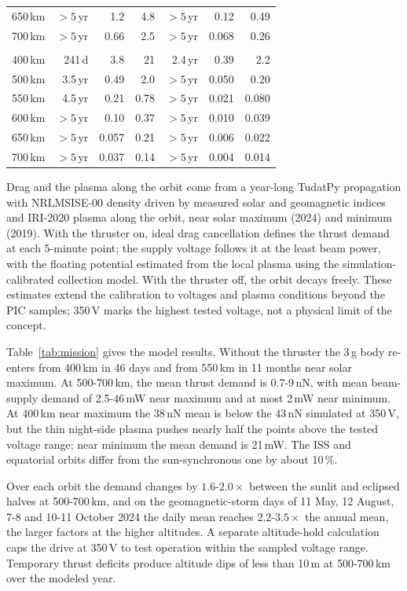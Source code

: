 \documentclass[11pt,twocolumn]{article}
\begin{document}
\begin{table}[t]
\begin{tabular}{@{}lrrrrrr@{}}
650\,km & $>5$\,yr & 1.2 & 4.8 & $>5$\,yr & 0.12 & 0.49 \\
700\,km & $>5$\,yr & 0.66 & 2.5 & $>5$\,yr & 0.068 & 0.26 \\
\addlinespace
\multicolumn{7}{@{}l}{\emph{2019, near solar minimum}} \\
400\,km & 241\,d & 3.8 & 21 & 2.4\,yr & 0.39 & 2.2 \\
500\,km & 3.5\,yr & 0.49 & 2.0 & $>5$\,yr & 0.050 & 0.20 \\
550\,km & 4.5\,yr & 0.21 & 0.78 & $>5$\,yr & 0.021 & 0.080 \\
600\,km & $>5$\,yr & 0.10 & 0.37 & $>5$\,yr & 0.010 & 0.039 \\
650\,km & $>5$\,yr & 0.057 & 0.21 & $>5$\,yr & 0.006 & 0.022 \\
700\,km & $>5$\,yr & 0.037 & 0.14 & $>5$\,yr & 0.004 & 0.014 \\
\bottomrule
\end{tabular}
\end{table}

Drag and the plasma along the orbit come from a year-long TudatPy propagation \cite{tudat} with NRLMSISE-00 density \cite{msis} driven by measured solar and geomagnetic indices and IRI-2020 plasma \cite{iri} along the orbit, near solar maximum (2024) and minimum (2019). With the thruster on, ideal drag cancellation defines the thrust demand at each 5-minute point; the supply voltage follows it at the least beam power, with the floating potential estimated from the local plasma using the simulation-calibrated collection model. With the thruster off, the orbit decays freely. These estimates extend the calibration to voltages and plasma conditions beyond the PIC samples; 350\,V marks the highest tested voltage, not a physical limit of the concept.

Table~\ref{tab:mission} gives the model results. Without the thruster the 3\,g body re-enters from 400\,km in 46 days and from 550\,km in 11 months near solar maximum. At 500-700\,km, the mean thrust demand is 0.7-9\,nN, with mean beam-supply demand of 2.5-46\,mW near maximum and at most 2\,mW near minimum. At 400\,km near maximum the 38\,nN mean is below the 43\,nN simulated at 350\,V, but the thin night-side plasma pushes nearly half the points above the tested voltage range; near minimum the mean demand is 21\,mW. The ISS and equatorial orbits differ from the sun-synchronous one by about 10\,\%.

Over each orbit the demand changes by $1.6$-$2.0\times$ between the sunlit and eclipsed halves at 500-700\,km, and on the geomagnetic-storm days of 11 May, 12 August, 7-8 and 10-11 October 2024 the daily mean reaches $2.2$-$3.5\times$ the annual mean, the larger factors at the higher altitudes. A separate altitude-hold calculation caps the drive at 350\,V to test operation within the sampled voltage range. Temporary thrust deficits produce altitude dips of less than 10\,m at 500-700\,km over the modeled year.
\end{document}
